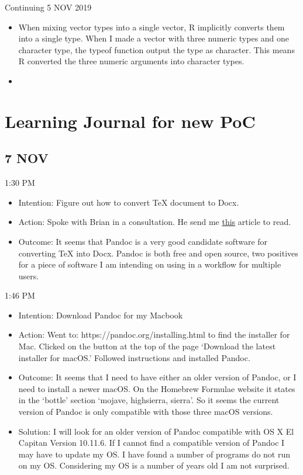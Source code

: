 \documentclass{article}
\begin{document}
Continuing 5 NOV 2019

\begin{itemize}
    \item When mixing vector types into a single vector, R implicitly converts them into a single type. When I made a vector with three numeric types and one character type, the typeof function output the type as character. This means R converted the three numeric arguments into character types.
    \item 
\end{itemize}

\section{Learning Journal for new PoC}

\subsection{7 NOV}

1:30 PM
\begin{itemize}
    \item Intention: Figure out how to convert TeX document to Docx.
    \item Action: Spoke with Brian in a consultation. He send me \href{https://medium.com/@zhelin\-chen91/how-to-convert-from-latex-to-ms-word-with-pandoc-f2045a762293}{this} article to read.
    \item Outcome: It seems that Pandoc is a very good candidate software for converting TeX into Docx. Pandoc is both free and open source, two positives for a piece of software I am intending on using in a workflow for multiple users.
\end{itemize}

1:46 PM
\begin{itemize}
    \item Intention: Download Pandoc for my Macbook
    \item Action: Went to: https://pandoc.org/installing.html to find the installer for Mac. Clicked on the button at the top of the page `Download the latest installer for macOS.' Followed instructions and installed Pandoc. 
    \item Outcome: It seems that I need to have either an older version of Pandoc, or I need to install a newer macOS. On the Homebrew Formulae website it states in the `bottle' section `mojave, high\textunderscore sierra, sierra'. So it seems the current version of Pandoc is only compatible with those three macOS versions.
    \item Solution: I will look for an older version of Pandoc compatible with OS X El Capitan Version 10.11.6. If I cannot find a compatible version of Pandoc I may have to update my OS. I have found a number of programs do not run on my OS. Considering my OS is a number of years old I am not surprised.
\end{itemize}
\end{document}
